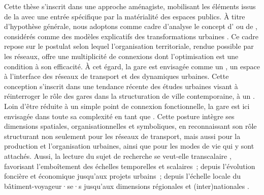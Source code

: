 \begin{refsegment}
Cette thèse s’inscrit dans une approche aménagiste, mobilisant les éléments issus de la  avec une entrée spécifique par la matérialité des espaces publics. À titre d'hypothèse générale, nous adoptons comme cadre d'analyse le concept d’ ou de , considérés comme des modèles explicatifs des transformations urbaines \textcolor{blue}{\autocite[]{dupuy_urbanisme_1991}}. Ce cadre repose sur le postulat selon lequel l’organisation territoriale, rendue possible par les réseaux, offre une multiplicité de connexions dont l’optimisation est une condition à son efficacité. À cet égard, la gare est envisagée comme un  \textcolor{blue}{\autocite[7]{moretti_interconnexion_1999}}, un espace à l'interface des réseaux de transport et des dynamiques urbaines. Cette conception s’inscrit dans une tendance récente des études urbaines visant à réinterroger le rôle des gares dans la structuration de ville contemporaine, à un  \textcolor{blue}{\autocite[489]{delage_gare_2013}}. Loin d’être réduite à un simple point de connexion fonctionnelle, la gare est ici envisagée dans toute sa complexité en tant que  \textcolor{blue}{\autocites[395]{le_bot_quel_2019}{le_bot_management_2020}}. Cette posture intègre ses dimensions spatiales, organisationnelles et symboliques, en reconnaissant son rôle structurant non seulement pour les réseaux de transport, mais aussi pour la production et l’organisation urbaines, ainsi que pour les modes de vie qui y sont attachés. Aussi, la lecture du sujet de recherche se veut-elle transcalaire \textcolor{blue}{\autocite[3]{knowles_transit_2019}}, favorisant l'emboîtement des échelles temporelles et scalaires~; depuis l’évolution foncière et économique jusqu'aux projets urbains~; depuis l’échelle locale du bâtiment-voyageur·se·s jusqu’aux dimensions régionales et (inter)nationales \textcolor{blue}{\autocites[13-14]{menerault_gares_2001}[238]{chapelon_transports_2016}}.%


\end{refsegment}

